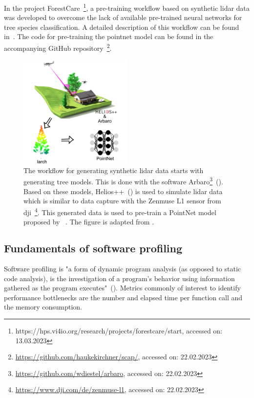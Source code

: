 \documentclass[12pt, a4paper, hidelinks]{article}
\begin{document}
In the project ForestCare~\footnote{https://hps.vi4io.org/research/projects/forestcare/start, accessed on: 13.03.2023}, a pre-training workflow based on synthetic lidar data was developed to overcome the lack of available pre-trained neural networks for tree species classification.
A detailed description of this workflow can be found in~.
The code for pre-training the pointnet model can be found in the accompanying GitHub repository~\footnote{\url{https://github.com/haukekirchner/scap/}, accessed on: 22.02.2023}.


\begin{figure}[H]
\centering
\includegraphics[width=0.5\textwidth]{assets/workflow_synthetic_data}
\caption[Workflow for generating synthetic lidar data ]{The workflow for generating synthetic lidar data starts with generating tree models. This is done with the software Arbaro\footnote{\url{https://github.com/wdiestel/arbaro}, accessed on: 22.02.2023}~(\cite{weber_1995_arbaro}). Based on these models, Helios++~(\cite{9906068}) is used to simulate lidar data which is similar to data capture with the Zenmuse L1 sensor from dji~\footnote{\url{https://www.dji.com/de/zenmuse-l1}, accessed on: 22.02.2023}. This generated data is used to pre-train a PointNet model proposed by ~\textcite{2017_qi_pointnet}. The figure is adapted from \textcite{9906068}.}
\label{fig:lidar-workflow}
\end{figure}

\subsection{Fundamentals of software profiling}
\label{sec:profiling}

Software profiling is "a form of dynamic program analysis (as opposed to static code analysis), is the investigation of a program's behavior using information gathered as the program executes"~(\cite{wiki:profiling}).
Metrics commonly of interest to identify performance bottlenecks are the number and elapsed time per function call and the memory consumption.
\end{document}
